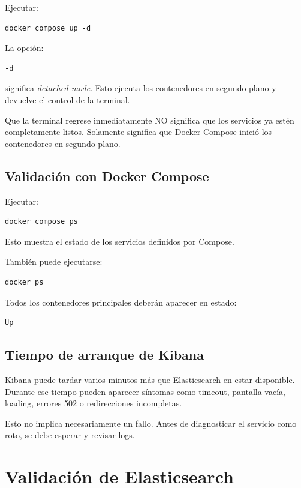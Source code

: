 \documentclass[
  coursetitle={Cómputo Nube y Tecnologías Emergentes},
  coursehours={96},
  coursedate={Verano 2026},
  doctype={Práctica},
  otherlangs={english,french},
  authorname={Lázaro},
  authorsurname={Bustio-Martínez},
  authortitle={PhD},
  role={Profesor Investigador},
  email={lbustio@inaoe.mx},
  phone={5559504000},
  ext={7459},
  institution={Instituto Nacional de Astrofísica, Óptica y Electrónica (INAOE)},
  department={Maestría en Ciencias en Tecnologías de Seguridad},
  address={Luis Enrique Erro 1, Sta. Ma. Tonantzintla, San Andrés Cholula, CP 72840, Puebla, México},
  margin={0.5in}
]{../../lbustio_lecture_notes}
\begin{document}
Ejecutar:

\begin{lstlisting}
docker compose up -d
\end{lstlisting}

La opción:

\begin{verbatim}
-d
\end{verbatim}

significa \textit{detached mode}. Esto ejecuta los contenedores en segundo plano y devuelve el control de la terminal.

Que la terminal regrese inmediatamente NO significa que los servicios ya estén completamente listos. Solamente significa que Docker Compose inició los contenedores en segundo plano.

\subsection{Validación con Docker Compose}

Ejecutar:

\begin{lstlisting}
docker compose ps
\end{lstlisting}

Esto muestra el estado de los servicios definidos por Compose.

También puede ejecutarse:

\begin{lstlisting}
docker ps
\end{lstlisting}

Todos los contenedores principales deberán aparecer en estado:

\begin{verbatim}
Up
\end{verbatim}

\subsection{Tiempo de arranque de Kibana}

Kibana puede tardar varios minutos más que Elasticsearch en estar disponible. Durante ese tiempo pueden aparecer síntomas como timeout, pantalla vacía, loading, errores 502 o redirecciones incompletas.

Esto no implica necesariamente un fallo. Antes de diagnosticar el servicio como roto, se debe esperar y revisar logs.

\section{Validación de Elasticsearch}
\end{document}
